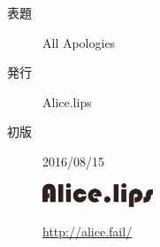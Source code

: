 \documentclass{jbook}
\begin{document}
\pagestyle{empty}

\vspace*{44mm}
\hspace*{-8mm}
\begin{minipage}{60mm}
    \begin{screen}
        \begin{description}
            \item[表題] All Apologies
            \item[発行] Alice.lips
            \item[初版] 2016/08/15
            \item[] \hspace*{3mm} \includegraphics[width=33mm, bb=0 0 476 103]{resources/logo.png} \vspace*{-4mm}
            \item[] \hspace*{16mm} \url{http://alice.fail/}
        \end{description}
    \end{screen}
\end{minipage}
\end{document}
